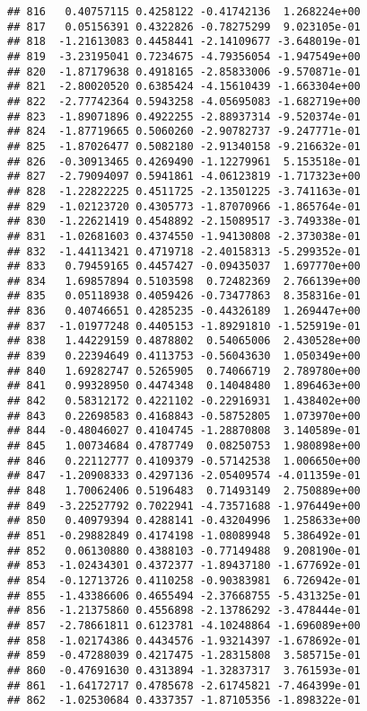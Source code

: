 \documentclass[
]{article}
\begin{document}
\begin{verbatim}
## 816   0.40757115 0.4258122 -0.41742136  1.268224e+00
## 817   0.05156391 0.4322826 -0.78275299  9.023105e-01
## 818  -1.21613083 0.4458441 -2.14109677 -3.648019e-01
## 819  -3.23195041 0.7234675 -4.79356054 -1.947549e+00
## 820  -1.87179638 0.4918165 -2.85833006 -9.570871e-01
## 821  -2.80020520 0.6385424 -4.15610439 -1.663304e+00
## 822  -2.77742364 0.5943258 -4.05695083 -1.682719e+00
## 823  -1.89071896 0.4922255 -2.88937314 -9.520374e-01
## 824  -1.87719665 0.5060260 -2.90782737 -9.247771e-01
## 825  -1.87026477 0.5082180 -2.91340158 -9.216632e-01
## 826  -0.30913465 0.4269490 -1.12279961  5.153518e-01
## 827  -2.79094097 0.5941861 -4.06123819 -1.717323e+00
## 828  -1.22822225 0.4511725 -2.13501225 -3.741163e-01
## 829  -1.02123720 0.4305773 -1.87070966 -1.865764e-01
## 830  -1.22621419 0.4548892 -2.15089517 -3.749338e-01
## 831  -1.02681603 0.4374550 -1.94130808 -2.373038e-01
## 832  -1.44113421 0.4719718 -2.40158313 -5.299352e-01
## 833   0.79459165 0.4457427 -0.09435037  1.697770e+00
## 834   1.69857894 0.5103598  0.72482369  2.766139e+00
## 835   0.05118938 0.4059426 -0.73477863  8.358316e-01
## 836   0.40746651 0.4285235 -0.44326189  1.269447e+00
## 837  -1.01977248 0.4405153 -1.89291810 -1.525919e-01
## 838   1.44229159 0.4878802  0.54065006  2.430528e+00
## 839   0.22394649 0.4113753 -0.56043630  1.050349e+00
## 840   1.69282747 0.5265905  0.74066719  2.789780e+00
## 841   0.99328950 0.4474348  0.14048480  1.896463e+00
## 842   0.58312172 0.4221102 -0.22916931  1.438402e+00
## 843   0.22698583 0.4168843 -0.58752805  1.073970e+00
## 844  -0.48046027 0.4104745 -1.28870808  3.140589e-01
## 845   1.00734684 0.4787749  0.08250753  1.980898e+00
## 846   0.22112777 0.4109379 -0.57142538  1.006650e+00
## 847  -1.20908333 0.4297136 -2.05409574 -4.011359e-01
## 848   1.70062406 0.5196483  0.71493149  2.750889e+00
## 849  -3.22527792 0.7022941 -4.73571688 -1.976449e+00
## 850   0.40979394 0.4288141 -0.43204996  1.258633e+00
## 851  -0.29882849 0.4174198 -1.08089948  5.386492e-01
## 852   0.06130880 0.4388103 -0.77149488  9.208190e-01
## 853  -1.02434301 0.4372377 -1.89437180 -1.677692e-01
## 854  -0.12713726 0.4110258 -0.90383981  6.726942e-01
## 855  -1.43386606 0.4655494 -2.37668755 -5.431325e-01
## 856  -1.21375860 0.4556898 -2.13786292 -3.478444e-01
## 857  -2.78661811 0.6123781 -4.10248864 -1.696089e+00
## 858  -1.02174386 0.4434576 -1.93214397 -1.678692e-01
## 859  -0.47288039 0.4217475 -1.28315808  3.585715e-01
## 860  -0.47691630 0.4313894 -1.32837317  3.761593e-01
## 861  -1.64172717 0.4785678 -2.61745821 -7.464399e-01
## 862  -1.02530684 0.4337357 -1.87105356 -1.898322e-01

\end{verbatim}
\end{document}
